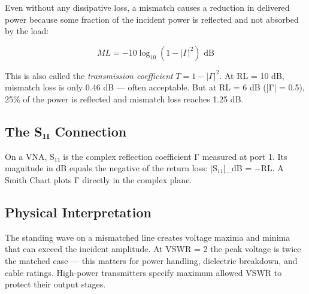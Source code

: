       

Even without any dissipative loss, a mismatch causes a reduction in delivered power because some fraction of the incident power is reflected and not absorbed by the load:

      
\[ML = -10\log_{10}(1-|\Gamma|^2)\text{ dB}\]

      

This is also called the \emph{transmission coefficient} $T = 1 - |\Gamma|^2$. At RL = 10 dB, mismatch loss is only 0.46 dB — often acceptable. But at RL = 6 dB (|Γ| = 0.5), 25\% of the power is reflected and mismatch loss reaches 1.25 dB.

      

\subsection{The S₁₁ Connection}

      

On a VNA, S₁₁ is the complex reflection coefficient Γ measured at port 1. Its magnitude in dB equals the negative of the return loss: |S₁₁|\_dB = −RL. A Smith Chart plots Γ directly in the complex plane.

      

\subsection{Physical Interpretation}

      

The standing wave on a mismatched line creates voltage maxima and minima that can exceed the incident amplitude. At VSWR = 2 the peak voltage is twice the matched case — this matters for power handling, dielectric breakdown, and cable ratings. High-power transmitters specify maximum allowed VSWR to protect their output stages.



